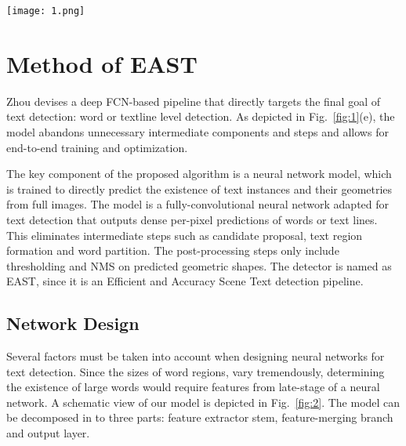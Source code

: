 \documentclass[10pt,twocolumn,letterpaper]{article}
\begin{document}
\begin{figure*}
	\begin{center}
		\texttt{[image: 1.png]}
	\end{center}
	\caption{Comparison of pipelines of several recent works on scene text detection: (a) Horizontal word detection and recognition pipeline proposed by Jaderberg \emph{et al.} \cite{Jaderberg2014Reading}; (b) Multi-orient text detection pipeline proposed by Zhang \emph{et al.} \cite{Zhang2016Multi}; (c) Multi-orient text detection pipeline proposed by Yao \emph{et al.} \cite{article}; (d) Horizontal text detection using CTPN, proposed by Tian \emph{et al.} \cite{Tian2016Detecting}; (e) Their pipeline, which eliminates most intermediate steps, consists of only two stages and is much simpler than previous solutions.} \label{fig:1}
\end{figure*}

\section{Method of EAST}

Zhou devises a deep FCN-based pipeline that directly targets the final goal of text detection: word or textline level detection. As depicted in Fig.~\ref{fig:1}(e), the model abandons unnecessary intermediate components and steps and allows for end-to-end training and optimization.

The key component of the proposed algorithm is a neural network model, which is trained to directly predict the existence of text instances and their geometries from full images. The model is a fully-convolutional neural network adapted for text detection that outputs dense per-pixel predictions of words or text lines. This eliminates intermediate steps such as candidate proposal, text region formation and word partition. The post-processing steps only include thresholding and NMS on predicted geometric shapes. The detector is named as EAST, since it is an Efficient and Accuracy Scene Text detection pipeline.

\subsection{Network Design}

Several factors must be taken into account when designing neural networks for text detection. Since the sizes of word regions, vary tremendously, determining the existence of large words would require features from late-stage of a neural network. A schematic view of our model is depicted in Fig.~\ref{fig:2}. The model can be decomposed in to three parts: feature extractor stem, feature-merging branch and output layer.
\end{document}
